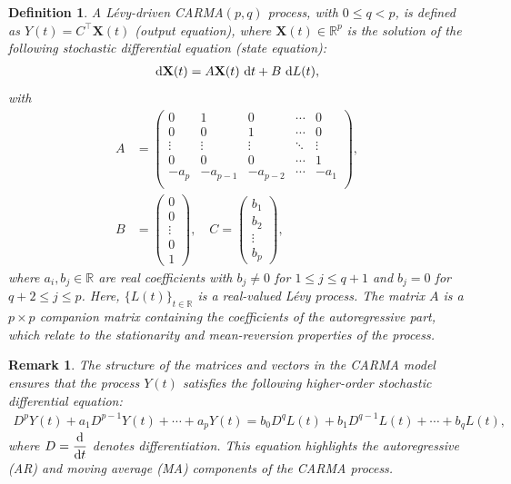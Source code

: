 \documentclass[10pt,a4paper,reqno]{amsart}
\newtheorem{definition}[theorem]{Definition}
\newtheorem{remark}[theorem]{Remark}
\theoremstyle{example}
\newcommand*\D{\mathop{}\!\textnormal{d}}
\begin{document}
\begin{definition}\label{def:CARMA}
A \emph{L\'evy-driven CARMA$(p,q)$ process}, with $0 \leq q < p$, is defined as $Y(t) = C^\top \mathbf{X}(t)$ (output equation), where $\mathbf{X}(t) \in \mathbb{R}^{p}$ is the solution of the following stochastic differential equation (state equation):
\begin{align}
\D \mathbf{X}(t) = A \mathbf{X}(t) \, \D t + B \, \D L(t), \label{eq:carma-state-equation}
\end{align}
with
\begin{align}
A &= \begin{pmatrix}
0 & 1 & 0 & \cdots & 0 \\
0 & 0 & 1 & \cdots & 0 \\
\vdots & \vdots & \vdots & \ddots & \vdots \\
0 & 0 & 0 & \cdots & 1 \\
- a_p & - a_{p-1} & - a_{p-2} & \cdots & - a_1 \\
\end{pmatrix}, \label{eq:state-transition-matrix} \\
B &= \begin{pmatrix}
0 \\
0 \\
\vdots \\
0 \\
1
\end{pmatrix}, \quad
C = \begin{pmatrix}
b_1 \\
b_2 \\
\vdots \\
b_p
\end{pmatrix}, \label{eq:input-output-vectors}
\end{align}
where $a_i, b_j \in \mathbb{R}$ are real coefficients with $b_j \neq 0$ for $1 \leq j \leq q+1$ and $b_j = 0$ for $q+2 \leq j \leq p$. Here, $\{L(t)\}_{t \in \mathbb{R}}$ is a real-valued L\'evy process. The matrix $A$ is a $p \times p$ companion matrix containing the coefficients of the autoregressive part, which relate to the stationarity and mean-reversion properties of the process.
\end{definition}

\begin{remark}
The structure of the matrices and vectors in the CARMA model ensures that the process $Y(t)$ satisfies the following higher-order stochastic differential equation:
\begin{align}
D^{p} Y(t) + a_1 D^{p-1} Y(t) + \cdots + a_p Y(t) = b_0 D^{q} L(t) + b_1 D^{q-1} L(t) + \cdots + b_q L(t), \label{eq:carma-sde}
\end{align}
where $D = \dfrac{\D}{\D t}$ denotes differentiation. This equation highlights the autoregressive (AR) and moving average (MA) components of the CARMA process.
\end{remark}
\end{document}
